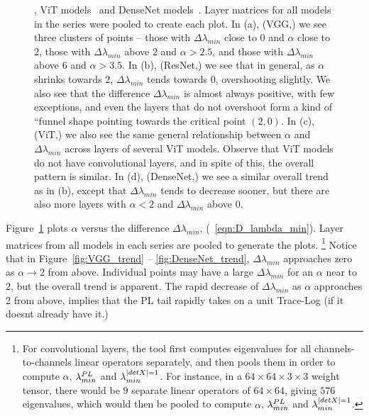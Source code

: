 \begin{figure}[t]
{        \cite{ResNet15_TR}, ViT models~\cite{VIT20_TR} and DenseNet models~\cite{DenseNet17_TR}. Layer matrices for all 
        models in the series were pooled to create each plot. In (a), (VGG,) we see three clusters of points -- those 
        with $\Delta \lambda_{min}$ close to $0$ and $\alpha$ close to $2$, those with $\Delta \lambda_{min}$ above $2$ 
        and $\alpha > 2.5$, and those with $\Delta \lambda_{min}$ above $6$ and $\alpha > 3.5$. In (b), (ResNet,) we see 
        that in general, as $\alpha$ shrinks towards $2$, $\Delta \lambda_{min}$ tends towards $0$, overshooting 
        slightly. We also see that the difference $\Delta\lambda_{min}$ is almost always positive, with few exceptions, 
        and even the layers that do not overshoot form a kind of ``funnel shape pointing towards the critical point 
        $(2, 0)$. In (c), (ViT,) we also see the same general relationship between $\alpha$ and $\Delta \lambda_{min}$ 
        across layers of several ViT models. Observe that ViT models do not have convolutional layers, and in spite of 
        this, the overall pattern is similar. In (d), (DenseNet,) we see a similar overall trend as in (b), except that 
        $\Delta\lambda_{min}$ tends to decrease sooner, but there are also more layers with $\alpha < 2$ and 
        $\Delta\lambda_{min}$ above $0$.
    }
  \label{fig:CV_ESD_trends}
\end{figure}


Figure~\ref{fig:CV_ESD_trends} plots $\alpha$ versus the difference $\Delta\lambda_{min}$, (\EQN~\ref{eqn:D_lambda_min}).
Layer matrices from all models in each series are pooled to generate the plots.%
\footnote{For convolutional layers, the \WW tool first computes eigenvalues for all channels-to-channels linear operators separately, and then pools them in order to compute $\alpha$, $\lambda^{PL}_{min}$ and $\lambda^{\vert detX\vert=1}_{min}$. For instance, in a $64\times 64\times 3\times 3$ weight tensor, there would be $9$ separate linear operators of $64\times 64$, giving $576$ eigenvalues, which would then be pooled to compute $\alpha$, $\lambda^{PL}_{min}$ and $\lambda^{\vert detX\vert=1}_{min}$.} 
Notice that in Figure~\ref{fig:VGG_trend} -- \ref{fig:DenseNet_trend}, $\Delta\lambda_{min}$ approaches zero as $\alpha\rightarrow 2$ from above. 
Individual points may have a large $\Delta\lambda_{min}$ for an $\alpha$ near to $2$, but the overall trend is apparent. 
The rapid decrease of $\Delta\lambda_{min}$ as $\alpha$ approaches $2$ from above, implies that the PL tail rapidly 
takes on a unit Trace-Log (if it doesnt already have it.)

